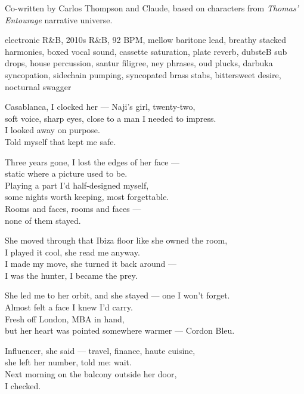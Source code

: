 
\begin{notes}
Co-written by Carlos Thompson and Claude, based on characters from \emph{Thomas’ Entourage} narrative universe.
\end{notes}
\begin{style}
electronic R\&B, 2010s R\&B, 92 BPM, mellow baritone lead, breathy stacked harmonies, boxed vocal sound, cassette saturation, plate reverb, dubsteB sub drops, house percussion, santur filigree, ney phrases, oud plucks, darbuka syncopation, sidechain pumping, syncopated brass stabs, bittersweet desire, nocturnal swagger
\end{style}
\begin{lyrics}
Casablanca, I clocked her — Naji's girl, twenty-two,\\
soft voice, sharp eyes, close to a man I needed to impress.\\
I looked away on purpose.\\
Told myself that kept me safe.

Three years gone, I lost the edges of her face —\\
static where a picture used to be.\\
Playing a part I'd half-designed myself,\\
some nights worth keeping, most forgettable.\\
Rooms and faces, rooms and faces —\\
none of them stayed.

She moved through that Ibiza floor like she owned the room,\\
I played it cool, she read me anyway.\\
I made my move, she turned it back around —\\
I was the hunter, I became the prey.

She led me to her orbit, and she stayed — one I won't forget.\\
Almost felt a face I knew I'd carry.\\
Fresh off London, MBA in hand,\\
but her heart was pointed somewhere warmer — Cordon Bleu.

Influencer, she said — travel, finance, haute cuisine,\\
she left her number, told me: wait.\\
Next morning on the balcony outside her door,\\
I checked.


\end{lyrics}
